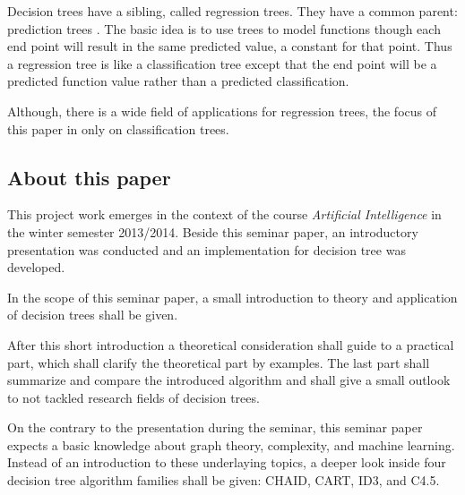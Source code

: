 Decision trees have a sibling, called regression trees. They have a common parent: prediction trees \cite{goldman2010self}. The basic idea is to use trees to model functions though each end point will result in the same predicted value, a constant for that point. Thus a regression tree is like a classification tree except that the end point will be a predicted function value rather than a predicted classification. 


   
Although, there is a wide field of applications for regression trees, the focus of this paper in only on classification trees.



\subsection{About this paper}

This project work emerges in the context of the course \textit{Artificial Intelligence} in the winter semester 2013/2014. Beside this seminar paper, an introductory presentation was conducted and an implementation for decision tree was developed. 

In the scope of this seminar paper, a small introduction to theory and application of decision trees shall be given. 

After this short introduction a theoretical consideration shall guide to a practical part, which shall clarify the theoretical part by examples. The last part shall summarize and compare the introduced algorithm and shall give a small outlook to not tackled research fields of decision trees.

On the contrary to the presentation during the seminar, this seminar paper expects a basic knowledge about graph theory, complexity, and machine learning. Instead of an introduction to these underlaying topics, a deeper look inside four decision tree algorithm families shall be given: \textsc{CHAID}, \textsc{CART}, \textsc{ID3}, and \textsc{C4.5}.  

